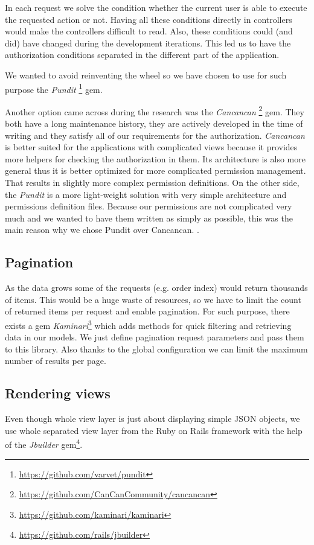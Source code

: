 In each request we solve the condition whether the current user is able to execute the requested action or not. Having all these conditions directly in controllers would make the controllers difficult to read. Also, these conditions could (and did) have changed during the development iterations. This led us to have the authorization conditions separated in the different part of the application.

We wanted to avoid reinventing the wheel so we have chosen to use for such purpose the \textit{Pundit} \footnote{\url{https://github.com/varvet/pundit}} gem. 

Another option came across during the research was the \textit{Cancancan} \footnote{\url{https://github.com/CanCanCommunity/cancancan}} gem. They both have a long maintenance history, they are actively developed in the time of writing and they satisfy all of our requirements for the authorization. \textit{Cancancan} is better suited for the applications with complicated views because it provides more helpers for checking the authorization in them. Its architecture is also more general thus it is better optimized for more complicated permission management. That results in slightly more complex permission definitions. On the other side, the \textit{Pundit} is a more light-weight solution with very simple architecture and permissions definition files. Because our permissions are not complicated very much and we wanted to have them written as simply as possible, this was the main reason why we chose Pundit over Cancancan.
.

 \subsection{Pagination}
 As the data grows some of the requests (e.g. order index) would return thousands of items. This would be a huge waste of resources, so we have to limit the count of returned items per request and enable pagination. For such purpose, there exists a gem \textit{Kaminari}\footnote{\url{https://github.com/kaminari/kaminari}} which adds methods for quick filtering and retrieving data in our models. We just define pagination request parameters and pass them to this library. Also thanks to the global configuration we can limit the maximum number of results per page.

\subsection{Rendering views}
	Even though whole view layer is just about displaying simple JSON objects, we use whole separated view layer from the Ruby on Rails framework with the help of the \textit{Jbuilder} gem\footnote{\url{https://github.com/rails/jbuilder}}.
	
